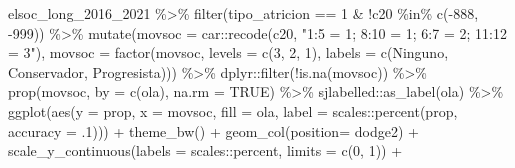 \documentclass[
  12pt,
]{book}
\newenvironment{Shaded}{\begin{snugshade}}{\end{snugshade}}
\newcommand{\AttributeTok}[1]{\textcolor[rgb]{0.77,0.63,0.00}{#1}}
\newcommand{\ConstantTok}[1]{\textcolor[rgb]{0.00,0.00,0.00}{#1}}
\newcommand{\DecValTok}[1]{\textcolor[rgb]{0.00,0.00,0.81}{#1}}
\newcommand{\FunctionTok}[1]{\textcolor[rgb]{0.00,0.00,0.00}{#1}}
\newcommand{\NormalTok}[1]{#1}
\newcommand{\SpecialCharTok}[1]{\textcolor[rgb]{0.00,0.00,0.00}{#1}}
\newcommand{\StringTok}[1]{\textcolor[rgb]{0.31,0.60,0.02}{#1}}
\begin{document}
\begin{Shaded}
\begin{Highlighting}[]
\NormalTok{elsoc\_long\_2016\_2021 }\SpecialCharTok{\%\textgreater{}\%}
    \FunctionTok{filter}\NormalTok{(tipo\_atricion }\SpecialCharTok{==} \DecValTok{1} \SpecialCharTok{\&} \SpecialCharTok{!}\NormalTok{c20 }\SpecialCharTok{\%in\%} \FunctionTok{c}\NormalTok{(}\SpecialCharTok{{-}}\DecValTok{888}\NormalTok{, }\SpecialCharTok{{-}}\DecValTok{999}\NormalTok{)) }\SpecialCharTok{\%\textgreater{}\%}
    \FunctionTok{mutate}\NormalTok{(}\AttributeTok{movsoc =}\NormalTok{ car}\SpecialCharTok{::}\FunctionTok{recode}\NormalTok{(c20, }\StringTok{"1:5 = 1; 8:10 = 1; 6:7 = 2; 11:12 = 3"}\NormalTok{),}
         \AttributeTok{movsoc =} \FunctionTok{factor}\NormalTok{(movsoc, }\AttributeTok{levels =} \FunctionTok{c}\NormalTok{(}\DecValTok{3}\NormalTok{, }\DecValTok{2}\NormalTok{, }\DecValTok{1}\NormalTok{),}
                         \AttributeTok{labels =} \FunctionTok{c}\NormalTok{(}\StringTok{\textquotesingle{}Ninguno\textquotesingle{}}\NormalTok{, }\StringTok{\textquotesingle{}Conservador\textquotesingle{}}\NormalTok{, }\StringTok{\textquotesingle{}Progresista\textquotesingle{}}\NormalTok{))) }\SpecialCharTok{\%\textgreater{}\%}
\NormalTok{    dplyr}\SpecialCharTok{::}\FunctionTok{filter}\NormalTok{(}\SpecialCharTok{!}\FunctionTok{is.na}\NormalTok{(movsoc)) }\SpecialCharTok{\%\textgreater{}\%}
    \FunctionTok{prop}\NormalTok{(movsoc, }\AttributeTok{by  =} \FunctionTok{c}\NormalTok{(ola), }\AttributeTok{na.rm =} \ConstantTok{TRUE}\NormalTok{)  }\SpecialCharTok{\%\textgreater{}\%} 
\NormalTok{    sjlabelled}\SpecialCharTok{::}\FunctionTok{as\_label}\NormalTok{(ola) }\SpecialCharTok{\%\textgreater{}\%} 
    \FunctionTok{ggplot}\NormalTok{(}\FunctionTok{aes}\NormalTok{(}\AttributeTok{y =}\NormalTok{ prop, }\AttributeTok{x =}\NormalTok{ movsoc, }\AttributeTok{fill =}\NormalTok{ ola, }
               \AttributeTok{label =}\NormalTok{ scales}\SpecialCharTok{::}\FunctionTok{percent}\NormalTok{(prop, }\AttributeTok{accuracy =}\NormalTok{ .}\DecValTok{1}\NormalTok{))) }\SpecialCharTok{+}
    \FunctionTok{theme\_bw}\NormalTok{() }\SpecialCharTok{+} 
    \FunctionTok{geom\_col}\NormalTok{(}\AttributeTok{position=} \StringTok{\textquotesingle{}dodge2\textquotesingle{}}\NormalTok{) }\SpecialCharTok{+}
    \FunctionTok{scale\_y\_continuous}\NormalTok{(}\AttributeTok{labels =}\NormalTok{ scales}\SpecialCharTok{::}\NormalTok{percent,}
                       \AttributeTok{limits =} \FunctionTok{c}\NormalTok{(}\DecValTok{0}\NormalTok{, }\DecValTok{1}\NormalTok{)) }\SpecialCharTok{+}

\end{Highlighting}
\end{Shaded}
\end{document}
